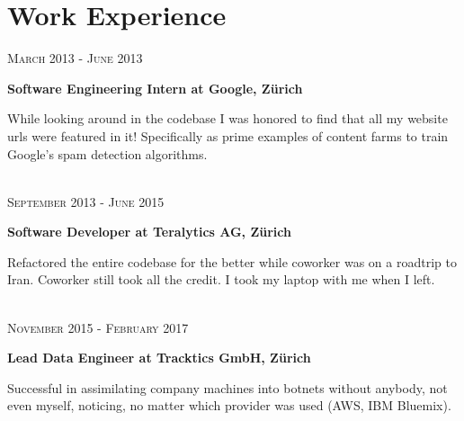 \documentclass[10pt]{article} %
\begin{document}
\begin{minipage}[t]{0.5\textwidth} %
\vspace{0pt} %
	





\section{Work Experience} 

{\raggedleft\textsc{March 2013 - June 2013}\par}

{\raggedright\large \textbf{Software Engineering Intern at Google, Z\"urich}\\
}

\normalsize{While looking around in the codebase I was honored to find that all my website urls were featured in it! Specifically as prime examples of content farms to train Google's spam detection algorithms.}\\
\\
{\raggedleft\textsc{September 2013 - June 2015}\par}

{\raggedright\large \textbf{Software Developer at Teralytics AG, Z\"urich}\\
}

\normalsize{Refactored the entire codebase for the better while coworker was on a roadtrip to Iran. Coworker still took all the credit. I took my laptop with me when I left.}
\\
\\
{\raggedleft\textsc{November 2015 - February 2017}\par}

{\raggedright\large \textbf{Lead Data Engineer at Tracktics GmbH, Z\"urich}\\
}

    \normalsize{Successful in assimilating company machines into botnets without anybody, not even myself, noticing, no matter which provider was used (AWS, IBM Bluemix).}
\\
\\


\end{minipage}
\end{document}
